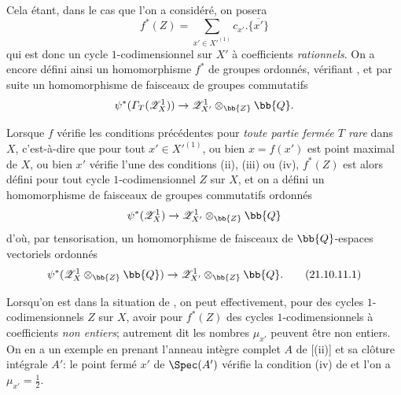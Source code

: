 \begin{env}[21.10.11]
Cela étant, dans le cas que l'on a considéré, on posera
\[
  f^*(Z)=\sum_{x'\in X'^{(1)}}c_{x'}.\overline{\{x'\}}
\]
qui est donc un cycle $1$-codimensionnel sur $X'$ à coefficients \emph{rationnels}.
On a encore défini ainsi un homomorphisme $f^*$ de groupes ordonnés, vérifiant , et par suite un homomorphisme de faisceaux de groupes commutatifs
\[
  \psi^*(\varGamma_T(\mathscr{Z}^1_X))\to\mathscr{Z}^1_{X'}\otimes_{\bb{Z}}\bb{Q}.
\]

Lorsque $f$ vérifie les conditions précédentes pour \emph{toute partie fermée $T$ rare} dans $X$, c'est-à-dire que pour tout $x'\in X'^{(1)}$, ou bien $x=f(x')$ est point maximal de $X$, ou bien $x'$ vérifie l'une des conditions (ii), (iii) ou (iv), $f^*(Z)$ est alors défini pour tout cycle $1$-codimensionnel $Z$ sur $X$, et on a défini un homomorphisme de faisceaux de groupes commutatifs ordonnés
\[
  \psi^*(\mathscr{Z}^1_X)\to\mathscr{Z}^1_{X'}\otimes_{\bb{Z}}\bb{Q}
\]
d'où, par tensorisation, un homomorphisme de faisceaux de $\bb{Q}$-espaces vectoriels ordonnés
\[
\label{IV.21.10.11.1}
  \psi^*(\mathscr{Z}^1_X\otimes_{\bb{Z}}\bb{Q})\to\mathscr{Z}^1_{X'}\otimes_{\bb{Z}}\bb{Q}.
  \tag{21.10.11.1}
\]
\end{env}

\begin{remark}[21.10.12]
\label{IV.21.10.12}
Lorsqu'on est dans la situation de , on peut effectivement, pour des cycles $1$-codimensionnels $Z$ sur $X$, avoir pour $f^*(Z)$ des cycles $1$-codimensionnels à coefficients \emph{non entiers}; autrement dit les nombres $\mu_{x'}$ peuvent être non entiers.
On en a un exemple en prenant l'anneau intègre complet $A$ de [(ii)] et sa clôture intégrale $A'$: le point fermé $x'$ de $\Spec(A')$ vérifie la condition (iv) de  et l'on a $\mu_{x'}=\frac12$.
\end{remark}

